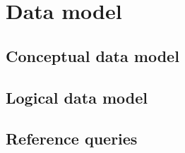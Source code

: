 \section{Data model}
\label{sec:data-model}


\subsection{Conceptual data model}
\label{sec:conceptual-data-model}

\subsection{Logical data model}
\label{sec:logical-data-model}

\subsection{Reference queries}
\label{sec:reference-queries}

